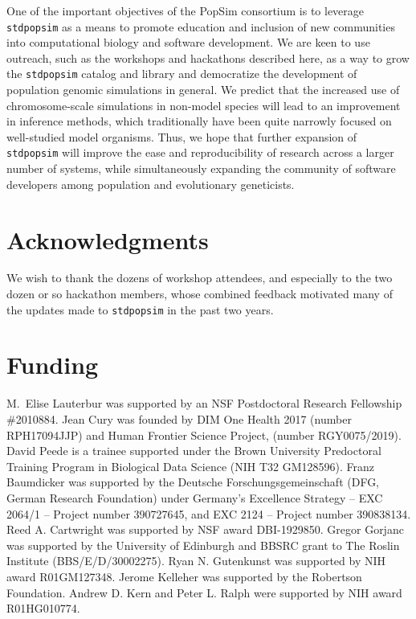 \documentclass[hidelinks]{article}
\newcommand{\stdpopsim}{\texttt{stdpopsim}\xspace}
\begin{document}
One of the important objectives of the PopSim consortium is to leverage \stdpopsim as a means to promote education and inclusion of new communities into
computational biology and software development.
We are keen to use outreach, such as the workshops and hackathons described here, 
as a way to grow the \stdpopsim catalog and library and
democratize the development of population genomic simulations in general.
We predict that the increased use of chromosome-scale simulations in non-model species will lead to an improvement in inference methods,
which traditionally have been quite narrowly focused on well-studied model organisms.
Thus, we hope that further expansion of \stdpopsim will improve the ease and reproducibility of research across a larger number of systems,
while simultaneously expanding the community of software developers among population and evolutionary geneticists.


\section*{Acknowledgments}\label{acknowledgements}

We wish to thank the dozens of workshop attendees,
and especially to the two dozen or so hackathon members,
whose combined feedback motivated many of the updates made to \stdpopsim in the past two years.

\section*{Funding}
    \label{funding}

M.~Elise Lauterbur was supported by an NSF Postdoctoral Research Fellowship \#2010884.
Jean Cury was founded by DIM One Health 2017 (number RPH17094JJP) and Human Frontier Science Project, (number RGY0075/2019).
David Peede is a trainee supported under the Brown University Predoctoral Training Program in Biological Data Science (NIH T32 GM128596).
Franz Baumdicker was supported by the Deutsche Forschungsgemeinschaft (DFG, German Research Foundation) under Germany’s Excellence Strategy – EXC 2064/1 – Project number 390727645, and EXC 2124 – Project number 390838134.
Reed A. Cartwright was supported by NSF award DBI-1929850.
Gregor Gorjanc was supported by the University of Edinburgh and BBSRC grant to The Roslin Institute (BBS/E/D/30002275).
Ryan N. Gutenkunst was supported by NIH award R01GM127348.
Jerome Kelleher was supported by the Robertson Foundation.
Andrew D. Kern and Peter L. Ralph were supported by NIH award R01HG010774.


\end{document}

